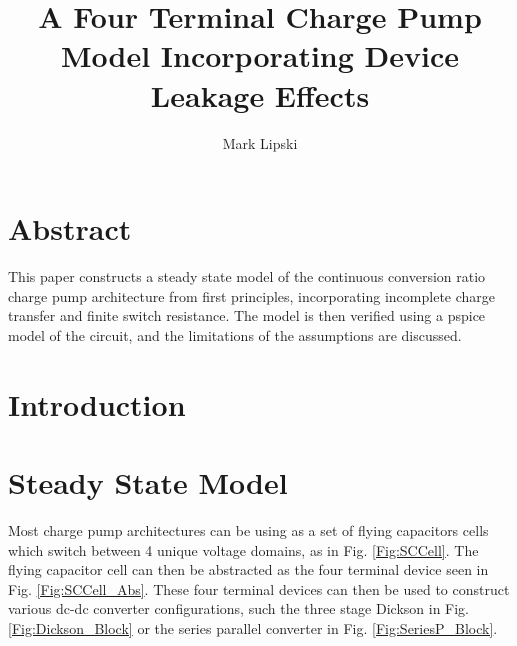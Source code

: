 \documentclass[conference]{IEEEtran}
\title{A Four Terminal Charge Pump Model Incorporating Device Leakage Effects}
\author{Mark Lipski}
\begin{document}
	\maketitle
	\section{Abstract}
	This paper constructs a steady state model of the continuous conversion ratio charge pump architecture from first principles, incorporating incomplete charge transfer and finite switch resistance. The model is then verified using a pspice model of the circuit, and the limitations of the assumptions are discussed.
	\section{Introduction}
	
	
	\section{Steady State Model}
	Most charge pump architectures can be using as a set of flying capacitors cells which switch between 4 unique voltage domains, as in Fig. \ref{Fig:SCCell}. The flying capacitor cell can then be abstracted as the four terminal device seen in Fig. \ref{Fig:SCCell_Abs}. These four terminal devices can then be used to construct various dc-dc converter configurations, such the three stage Dickson in Fig. \ref{Fig:Dickson_Block} or the series parallel converter in Fig. \ref{Fig:SeriesP_Block}.
	
\end{document}
